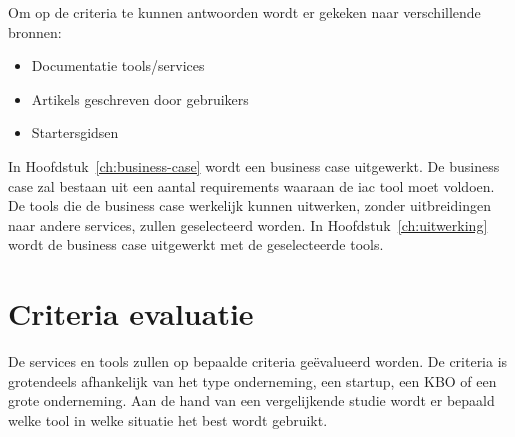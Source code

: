 Om op de criteria te kunnen antwoorden wordt er gekeken naar verschillende bronnen:

\begin{itemize}
    \item Documentatie tools/services
    \item Artikels geschreven door gebruikers
    \item Startersgidsen
\end{itemize}

In Hoofdstuk~\ref{ch:business-case} wordt een business case uitgewerkt.
De business case zal bestaan uit een aantal requirements waaraan de \acrshort{iac} tool moet voldoen.
De tools die de business case werkelijk kunnen uitwerken, zonder uitbreidingen naar andere services, zullen geselecteerd worden.
In Hoofdstuk~\ref{ch:uitwerking} wordt de business case uitgewerkt met de geselecteerde tools.





\section{Criteria evaluatie}
\label{sec:criteria-evaluatie}

De services en tools zullen op bepaalde criteria geëvalueerd worden.
De criteria is grotendeels afhankelijk van het type onderneming, een startup, een KBO of een grote onderneming.
Aan de hand van een vergelijkende studie wordt er bepaald welke tool in welke situatie het best wordt gebruikt.

